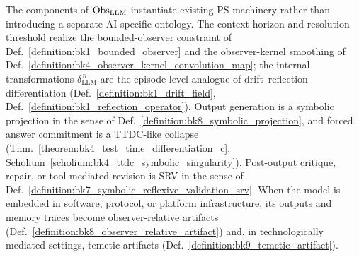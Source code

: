 \begin{remark}
\label{remark:appD_llm_tuple_anchors}
The components of $\mathrm{Obs}_{\mathrm{LLM}}$ instantiate existing PS machinery rather
than introducing a separate AI-specific ontology. The context horizon and
resolution threshold realize the bounded-observer constraint of
Def.~\ref{definition:bk1_bounded_observer} and the observer-kernel smoothing of
Def.~\ref{definition:bk4_observer_kernel_convolution_map}; the internal
transformations $\delta_{\mathrm{LLM}}^{\,n}$ are the episode-level analogue of
drift--reflection differentiation (Def.~\ref{definition:bk1_drift_field},
Def.~\ref{definition:bk1_reflection_operator}). Output generation is a symbolic
projection in the sense of Def.~\ref{definition:bk8_symbolic_projection}, and
forced answer commitment is a TTDC-like collapse
(Thm.~\ref{theorem:bk4_test_time_differentiation_c},
Scholium~\ref{scholium:bk4_ttdc_symbolic_singularity}). Post-output critique,
repair, or tool-mediated revision is SRV in the sense of
Def.~\ref{definition:bk7_symbolic_reflexive_validation_srv}. When the model is
embedded in software, protocol, or platform infrastructure, its outputs and
memory traces become observer-relative artifacts
(Def.~\ref{definition:bk8_observer_relative_artifact}) and, in technologically
mediated settings, temetic artifacts (Def.~\ref{definition:bk9_temetic_artifact}).
\end{remark}
